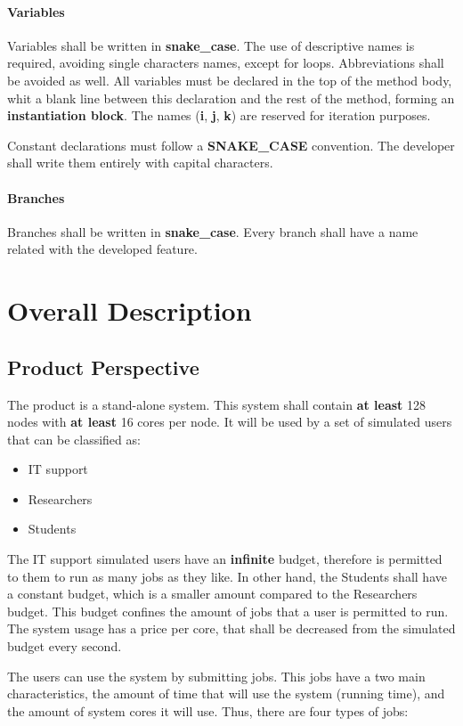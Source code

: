 \documentclass{scrreprt}
\begin{document}
\subsubsection{Variables}

\par Variables shall be written in \textbf{snake_case}. The use of descriptive names is required, avoiding single characters names, except for loops. Abbreviations shall be avoided as well. All variables must be declared in the top of the method body, whit a blank line between this declaration and the rest of the method, forming an \textbf{instantiation block}. The names (\textbf{i}, \textbf{j}, \textbf{k}) are reserved for iteration purposes. 
\par Constant declarations must follow a \textbf{SNAKE_CASE} convention. The developer shall write them entirely with capital characters.


\subsubsection{Branches}

\par Branches shall be written in \textbf{snake_case}. Every branch shall have a name related with the developed feature. 

\chapter{Overall Description}

\section{Product Perspective}
\par The product is a stand-alone system. This system shall contain \textbf{at least} 128 nodes with \textbf{at least} 16 cores per node. It will be used by a set of simulated users that can be classified as:

\begin{itemize}
\item IT support
\item Researchers
\item Students
\end{itemize}

\par The IT support simulated users have an \textbf{infinite} budget, therefore is permitted to them to run as many jobs as they like. In other hand, the Students shall have a constant budget, which is a smaller amount compared to the Researchers budget. This budget confines the amount of jobs that a user is permitted to run. The system usage has a price per core, that shall be decreased from the simulated budget every second.
\par The users can use the system by submitting jobs. This jobs have a two main characteristics, the amount of time that will use the system (running time), and the amount of system cores it will use. Thus, there are four types of jobs:
\end{document}
